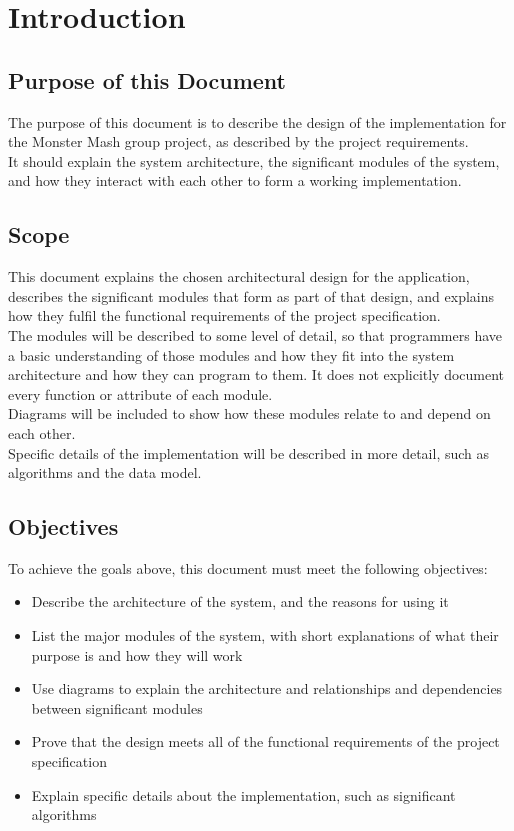 \section{Introduction}

\subsection{Purpose of this Document}
The purpose of this document is to describe the design of the implementation for the Monster Mash group project, as described by the project requirements.\\

It should explain the system architecture, the significant modules of the system, and how they interact with each other to form a working implementation.

\subsection{Scope}
This document explains the chosen architectural design for the application, describes the significant modules that form as part of that design, and explains how they fulfil the functional requirements of the project specification.\\

The modules will be described to some level of detail, so that programmers have a basic understanding of those modules and how they fit into the system architecture and how they can program to them. It does not explicitly document every function or attribute of each module.\\

Diagrams will be included to show how these modules relate to and depend on each other.\\

Specific details of the implementation will be described in more detail, such as algorithms and the data model.


\subsection{Objectives}
To achieve the goals above, this document must meet the following objectives:
\begin{itemize}
\item Describe the architecture of the system, and the reasons for using it
\item List the major modules of the system, with short explanations of what their purpose is and how they will work
\item Use diagrams to explain the architecture and relationships and dependencies between significant modules
\item Prove that the design meets all of the functional requirements of the project specification
\item Explain specific details about the implementation, such as significant algorithms
\end{itemize}

